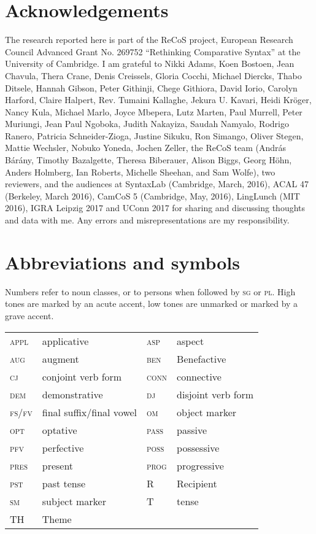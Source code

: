 \documentclass[output=paper
,modfonts
,nonflat]{langsci/langscibook}
\begin{document}
\section*{Acknowledgements}
The research reported here is part of the ReCoS project, European Research Council Advanced Grant No. 269752 ``Rethinking Comparative Syntax'' at the University of Cambridge. I am grateful to Nikki Adams, Koen Bostoen, Jean Chavula, Thera Crane, Denis Creissels, Gloria Cocchi, Michael Diercks, Thabo Ditsele, Hannah Gibson, Peter Githinji, Chege Githiora, David Iorio, Carolyn Harford, Claire Halpert, Rev. Tumaini Kallaghe, Jekura U. Kavari, Heidi Kröger, Nancy Kula, Michael Marlo, Joyce Mbepera, Lutz Marten, Paul Murrell, Peter Muriungi, Jean Paul Ngoboka, Judith Nakayiza, Saudah Namyalo, Rodrigo Ranero, Patricia Schneider-Zioga, Justine Sikuku, Ron Simango, Oliver Stegen, Mattie Wechsler, Nobuko Yoneda, Jochen Zeller, the ReCoS team (András Bárány, Timothy Bazalgette, Theresa Biberauer, Alison Biggs, Georg Höhn, Anders Holmberg, Ian Roberts, Michelle Sheehan, and Sam Wolfe), two reviewers, and the audiences at SyntaxLab (Cambridge, March, 2016), ACAL 47 (Berkeley, March 2016), CamCoS 5 (Cambridge, May, 2016), LingLunch (MIT 2016), IGRA Leipzig 2017 and UConn 2017 for sharing and discussing thoughts and data with me. Any errors and misrepresentations are my responsibility.

\section*{Abbreviations and symbols}
Numbers refer to noun classes, or to persons when followed by \textsc{sg} or \textsc{pl}. High tones are marked by an acute accent, low tones are unmarked or marked by a grave accent.
\begin{table}
	\begin{tabular}{llll} 	
		\textsc{appl} 	& applicative 					& \textsc{asp} 	& aspect \\ 	
		\textsc{aug} 	& augment 						& \textsc{ben} 	& Benefactive \\	
		\textsc{cj} 	& conjoint verb form 			& \textsc{conn} & connective \\	
		\textsc{dem}	& demonstrative 				& \textsc{dj} 	& disjoint verb form \\ 
		\textsc{fs/fv} 	& final suffix/final vowel 		& \textsc{om} 	& object marker \\	
		\textsc{opt}	& optative 						& \textsc{pass} & passive \\	
		\textsc{pfv} 	& perfective 					& \textsc{poss} & possessive \\	
		\textsc{pres} 	& present 						& \textsc{prog} & progressive \\	
		\textsc{pst} 	& past tense 					& R 			& Recipient \\	
		\textsc{sm} 	& subject marker 				& T 			& tense \\	
		TH 				& Theme 						&				&
	\end{tabular}		
\end{table}


\printbibliography[heading=subbibliography,notkeyword=this]
\end{document}
